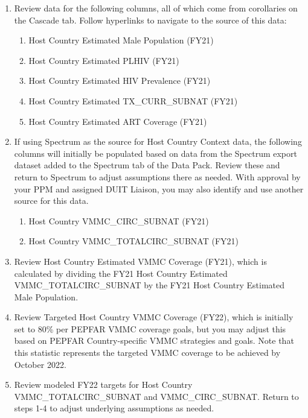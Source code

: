 \documentclass[
  openany]{book}
\begin{document}
\begin{enumerate}
\def\labelenumi{\arabic{enumi}.}
\item
  Review data for the following columns, all of which come from
  corollaries on the Cascade tab. Follow hyperlinks to navigate to the
  source of this data:

  \begin{enumerate}
  \def\labelenumii{\alph{enumii}.}
  \item
    Host Country Estimated Male Population (FY21)
  \item
    Host Country Estimated PLHIV (FY21)
  \item
    Host Country Estimated HIV Prevalence (FY21)
  \item
    Host Country Estimated TX\_CURR\_SUBNAT (FY21)
  \item
    Host Country Estimated ART Coverage (FY21)
  \end{enumerate}
\item
  If using Spectrum as the source for Host Country Context data, the
  following columns will initially be populated based on data from the
  Spectrum export dataset added to the Spectrum tab of the Data Pack.
  Review these and return to Spectrum to adjust assumptions there as
  needed. With approval by your PPM and assigned DUIT Liaison, you may
  also identify and use another source for this data.

  \begin{enumerate}
  \def\labelenumii{\alph{enumii}.}
  \item
    Host Country VMMC\_CIRC\_SUBNAT (FY21)
  \item
    Host Country VMMC\_TOTALCIRC\_SUBNAT (FY21)
  \end{enumerate}
\item
  Review Host Country Estimated VMMC Coverage (FY21), which is
  calculated by dividing the FY21 Host Country Estimated
  VMMC\_TOTALCIRC\_SUBNAT by the FY21 Host Country Estimated Male
  Population.
\item
  Review Targeted Host Country VMMC Coverage (FY22), which is
  initially set to 80\% per PEPFAR VMMC coverage goals, but you may
  adjust this based on PEPFAR Country-specific VMMC strategies and
  goals. Note that this statistic represents the targeted VMMC
  coverage to be achieved by October 2022.
\item
  Review modeled FY22 targets for Host Country VMMC\_TOTALCIRC\_SUBNAT
  and VMMC\_CIRC\_SUBNAT. Return to steps 1-4 to adjust underlying
  assumptions as needed.
\end{enumerate}
\end{document}
